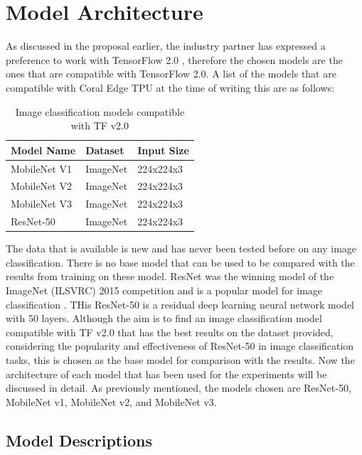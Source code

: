 \section{Model Architecture}

As discussed in the proposal earlier, the industry partner has expressed a preference to work with TensorFlow 2.0 \cite{tensorflowEffectiveTensorflow}, therefore the chosen models are the ones that are compatible with TensorFlow 2.0. A list of the models that are compatible with Coral Edge TPU at the time of writing this are as follows:

\begin{table}[ht!]
\centering
\begin{tabularx}{\textwidth}{@{} *3{X} @{}}
\toprule
\textbf{Model Name} & \textbf{Dataset} & \textbf{Input Size}\\
\midrule
    MobileNet V1     & ImageNet & 224x224x3   \\[1.3ex]
    MobileNet V2    &  ImageNet & 224x224x3  \\[1.3ex]
    MobileNet V3     & ImageNet & 224x224x3  \\[1.3ex]
    ResNet-50     &  ImageNet & 224x224x3  \\[1.3ex]
\bottomrule
\end{tabularx}
\caption{Image classification models compatible with TF v2.0}
\label{table:tf2_models}
\end{table}

The data that is available is new and has never been tested before on any image classification. There is no base model that can be used to be compared with the results from training on these model. ResNet was the winning model of the ImageNet (ILSVRC) 2015 competition and is a popular model for image classification \cite{cocskun2017overview}. THis ResNet-50 is a residual deep learning neural network model with 50 layers. Although the aim is to find an image classification model compatible with TF v2.0 that has the best results on the dataset provided, considering the popularity and effectiveness of ResNet-50 in image classification tasks, this is chosen as the base model for comparison with the results. Now the architecture of each model that has been used for the experiments will be discussed in detail. As previously mentioned, the models chosen are ResNet-50, MobileNet v1, MobileNet v2, and MobileNet v3.

\subsection{Model Descriptions}

